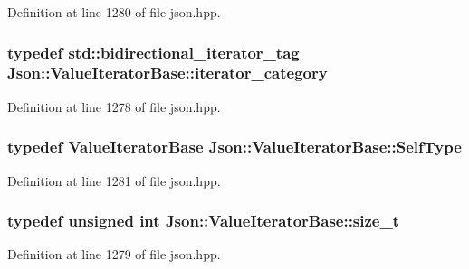 Definition at line 1280 of file json.\-hpp.

\hypertarget{class_json_1_1_value_iterator_base_a02fd11a4fbdc0007da1e8bcf5e6b83c3}{
\subsubsection[{iterator\-\_\-category}]{\setlength{\rightskip}{0pt plus 5cm}typedef std\-::bidirectional\-\_\-iterator\-\_\-tag {\bf Json\-::\-Value\-Iterator\-Base\-::iterator\-\_\-category}}}\label{class_json_1_1_value_iterator_base_a02fd11a4fbdc0007da1e8bcf5e6b83c3}


Definition at line 1278 of file json.\-hpp.

\hypertarget{class_json_1_1_value_iterator_base_a9d2a940d03ea06d20d972f41a89149ee}{
\subsubsection[{Self\-Type}]{\setlength{\rightskip}{0pt plus 5cm}typedef {\bf Value\-Iterator\-Base} {\bf Json\-::\-Value\-Iterator\-Base\-::\-Self\-Type}}}\label{class_json_1_1_value_iterator_base_a9d2a940d03ea06d20d972f41a89149ee}


Definition at line 1281 of file json.\-hpp.

\hypertarget{class_json_1_1_value_iterator_base_a9d3a3c7ce5cdefe23cb486239cf07bb5}{
\subsubsection[{size\-\_\-t}]{\setlength{\rightskip}{0pt plus 5cm}typedef unsigned int {\bf Json\-::\-Value\-Iterator\-Base\-::size\-\_\-t}}}\label{class_json_1_1_value_iterator_base_a9d3a3c7ce5cdefe23cb486239cf07bb5}


Definition at line 1279 of file json.\-hpp.



